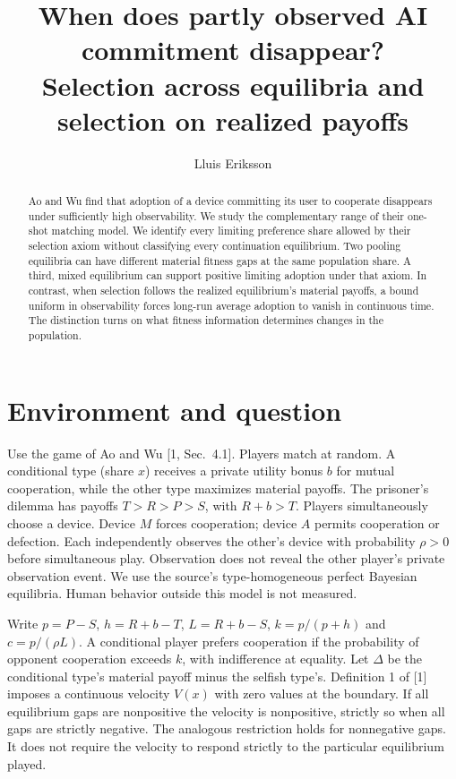 \documentclass[11pt]{article}
\title{When does partly observed AI commitment disappear?\\Selection across equilibria and selection on realized payoffs}
\author{Lluis Eriksson}
\date{}
\begin{document}
\maketitle
\begin{abstract}
Ao and Wu find that adoption of a device committing its user to cooperate disappears under sufficiently high observability. We study the complementary range of their one-shot matching model. We identify every limiting preference share allowed by their selection axiom without classifying every continuation equilibrium. Two pooling equilibria can have different material fitness gaps at the same population share. A third, mixed equilibrium can support positive limiting adoption under that axiom. In contrast, when selection follows the realized equilibrium's material payoffs, a bound uniform in observability forces long-run average adoption to vanish in continuous time. The distinction turns on what fitness information determines changes in the population.
\end{abstract}
\section{Environment and question}
Use the game of Ao and Wu [1, Sec.~4.1]. Players match at random. A conditional type (share $x$) receives a private utility bonus $b$ for mutual cooperation, while the other type maximizes material payoffs. The prisoner's dilemma has payoffs $T>R>P>S$, with $R+b>T$. Players simultaneously choose a device. Device $M$ forces cooperation; device $A$ permits cooperation or defection. Each independently observes the other's device with probability $\rho>0$ before simultaneous play. Observation does not reveal the other player's private observation event. We use the source's type-homogeneous perfect Bayesian equilibria. Human behavior outside this model is not measured.

Write $p=P-S$, $h=R+b-T$, $L=R+b-S$, $k=p/(p+h)$ and $c=p/(\rho L)$. A conditional player prefers cooperation if the probability of opponent cooperation exceeds $k$, with indifference at equality. Let $\Delta$ be the conditional type's material payoff minus the selfish type's. Definition 1 of [1] imposes a continuous velocity $V(x)$ with zero values at the boundary. If all equilibrium gaps are nonpositive the velocity is nonpositive, strictly so when all gaps are strictly negative. The analogous restriction holds for nonnegative gaps. It does not require the velocity to respond strictly to the particular equilibrium played.
\end{document}
